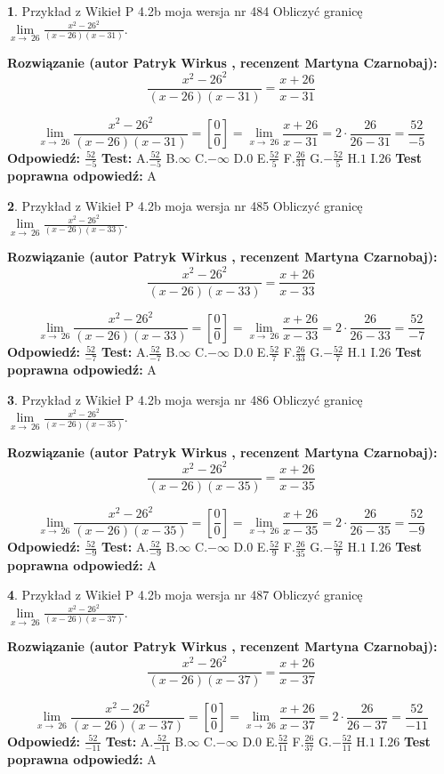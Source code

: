 \documentclass[12pt, a4paper]{article}
\theoremstyle{definition} %
\newtheorem{zad}{}
\newcommand{\zadStart}[1]{\begin{zad}#1\newline}
\newcommand{\zadStop}{\end{zad}}
\newcommand{\rozwStart}[2]{\noindent \textbf{Rozwiązanie (autor #1 , recenzent #2): }\newline}
\newcommand{\rozwStop}{\newline}
\newcommand{\odpStart}{\noindent \textbf{Odpowiedź:}\newline}
\newcommand{\odpStop}{\newline}
\newcommand{\testStart}{\noindent \textbf{Test:}\newline}
\newcommand{\testStop}{\newline}
\newcommand{\kluczStart}{\noindent \textbf{Test poprawna odpowiedź:}\newline}
\newcommand{\kluczStop}{\newline}
\begin{document}
\zadStart{Przykład z Wikieł P 4.2b moja wersja nr 484}
Obliczyć granicę $\lim\limits_{x\to\ 26}\frac{x^{2}-26^{2}}{(x-26)(x-31)}$.
\zadStop
\rozwStart{Patryk Wirkus}{Martyna Czarnobaj}
$$\frac{x^{2}-26^{2}}{(x-26)(x-31)}=\frac{x+26}{x-31}$$

$$\lim\limits_{x\to\ 26}\frac{x^{2}-26^{2}}{(x-26)(x-31)}=[\frac{0}{0}]=\lim\limits_{x\to\ 26}\frac{x+26}{x-31}=2 \cdot \frac{26}{26-31} = \frac{52}{-5}$$
\rozwStop
\odpStart
$\frac{52}{-5}$
\odpStop
\testStart
A.$\frac{52}{-5}$
B.$\infty$
C.$-\infty$
D.$0$
E.$\frac{52}{5}$
F.$\frac{26}{31}$
G.$-\frac{52}{5}$
H.$1$
I.$26$
\testStop
\kluczStart
A
\kluczStop



\zadStart{Przykład z Wikieł P 4.2b moja wersja nr 485}
Obliczyć granicę $\lim\limits_{x\to\ 26}\frac{x^{2}-26^{2}}{(x-26)(x-33)}$.
\zadStop
\rozwStart{Patryk Wirkus}{Martyna Czarnobaj}
$$\frac{x^{2}-26^{2}}{(x-26)(x-33)}=\frac{x+26}{x-33}$$

$$\lim\limits_{x\to\ 26}\frac{x^{2}-26^{2}}{(x-26)(x-33)}=[\frac{0}{0}]=\lim\limits_{x\to\ 26}\frac{x+26}{x-33}=2 \cdot \frac{26}{26-33} = \frac{52}{-7}$$
\rozwStop
\odpStart
$\frac{52}{-7}$
\odpStop
\testStart
A.$\frac{52}{-7}$
B.$\infty$
C.$-\infty$
D.$0$
E.$\frac{52}{7}$
F.$\frac{26}{33}$
G.$-\frac{52}{7}$
H.$1$
I.$26$
\testStop
\kluczStart
A
\kluczStop



\zadStart{Przykład z Wikieł P 4.2b moja wersja nr 486}
Obliczyć granicę $\lim\limits_{x\to\ 26}\frac{x^{2}-26^{2}}{(x-26)(x-35)}$.
\zadStop
\rozwStart{Patryk Wirkus}{Martyna Czarnobaj}
$$\frac{x^{2}-26^{2}}{(x-26)(x-35)}=\frac{x+26}{x-35}$$

$$\lim\limits_{x\to\ 26}\frac{x^{2}-26^{2}}{(x-26)(x-35)}=[\frac{0}{0}]=\lim\limits_{x\to\ 26}\frac{x+26}{x-35}=2 \cdot \frac{26}{26-35} = \frac{52}{-9}$$
\rozwStop
\odpStart
$\frac{52}{-9}$
\odpStop
\testStart
A.$\frac{52}{-9}$
B.$\infty$
C.$-\infty$
D.$0$
E.$\frac{52}{9}$
F.$\frac{26}{35}$
G.$-\frac{52}{9}$
H.$1$
I.$26$
\testStop
\kluczStart
A
\kluczStop



\zadStart{Przykład z Wikieł P 4.2b moja wersja nr 487}
Obliczyć granicę $\lim\limits_{x\to\ 26}\frac{x^{2}-26^{2}}{(x-26)(x-37)}$.
\zadStop
\rozwStart{Patryk Wirkus}{Martyna Czarnobaj}
$$\frac{x^{2}-26^{2}}{(x-26)(x-37)}=\frac{x+26}{x-37}$$

$$\lim\limits_{x\to\ 26}\frac{x^{2}-26^{2}}{(x-26)(x-37)}=[\frac{0}{0}]=\lim\limits_{x\to\ 26}\frac{x+26}{x-37}=2 \cdot \frac{26}{26-37} = \frac{52}{-11}$$
\rozwStop
\odpStart
$\frac{52}{-11}$
\odpStop
\testStart
A.$\frac{52}{-11}$
B.$\infty$
C.$-\infty$
D.$0$
E.$\frac{52}{11}$
F.$\frac{26}{37}$
G.$-\frac{52}{11}$
H.$1$
I.$26$
\testStop
\kluczStart
A
\kluczStop
\end{document}
